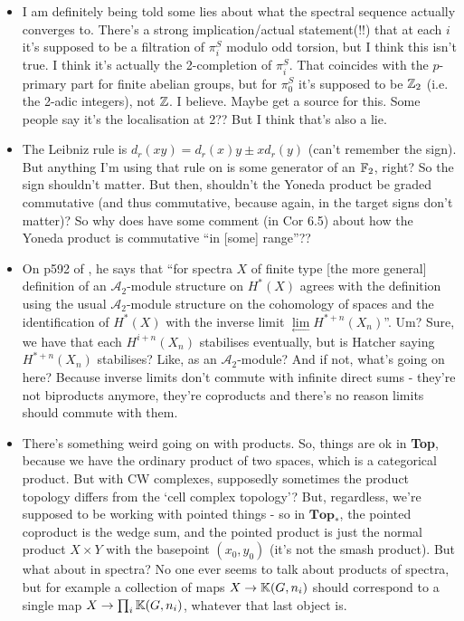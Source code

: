 \documentclass{MetricNotes2023}
\def\bb{\ensuremath\mathbb}
\def\inte{\ensuremath\mathbb{Z}}
\def\A{\ensuremath{\mathscr{A}_2}}
\begin{document}
\begin{itemize}
\item I am definitely being told some lies about what the spectral sequence actually converges to. There's a strong implication/actual statement(!!) that at each \(i\) it's supposed to be a filtration of \(\pi_i^S\) modulo odd torsion, but I think this isn't true. I think it's actually the 2-completion of \(\pi_i^S\). That coincides with the \(p\)-primary part for finite abelian groups, but for \(\pi_0^S\) it's supposed to be \(\inte_2\) (i.e. the 2-adic integers), not \(\inte\). I believe. Maybe get a source for this. Some people say it's the localisation at 2?? But I think that's also a lie. 

\item The Leibniz rule is \(d_r(xy)=d_r(x)y\pm xd_r(y)\) (can't remember the sign). But anything I'm using that rule on is some generator of an \(\bb{F}_2\), right? So the sign shouldn't matter. But then, shouldn't the Yoneda product be graded commutative (and thus commutative, because again, in the target signs don't matter)? So why does \autocite{ass} have some comment (in Cor 6.5) about how the Yoneda product is commutative ``in [some] range''?? 

\item On p592 of \autocite{hatcher5}, he says that ``for spectra \(X\) of finite type [the more general] definition of an \(\A\)-module structure on \(H^*(X)\) agrees with the definition using the usual \(\A\)-module structure on the cohomology of spaces and the identification of \(H^*(X)\) with the inverse limit \(\lim\limits_{\leftarrow}H^{*+n}(X_n)\)''. Um? Sure, we have that each \(H^{i+n}(X_n)\) stabilises eventually, but is Hatcher saying \(H^{*+n}(X_n)\) stabilises? Like, as an \(\A\)-module? And if not, what's going on here? Because inverse limits don't commute with infinite direct sums - they're not biproducts anymore, they're coproducts and there's no reason limits should commute with them. 

\item There's something weird going on with products. So, things are ok in \textbf{Top}, because we have the ordinary product of two spaces, which is a categorical product. But with CW complexes, supposedly sometimes the product topology differs from the `cell complex topology'? But, regardless, we're supposed to be working with pointed things - so in \(\textbf{Top}_*\), the pointed coproduct is the wedge sum, and the pointed product is just the normal product \(X\times Y\) with the basepoint \((x_0,y_0)\) (it's not the smash product). But what about in spectra? No one ever seems to talk about products of spectra, but for example a collection of maps \(X\to \bb{K}(G,n_i)\) should correspond to a single map \(X\to \prod_i \bb{K}(G,n_i)\), whatever that last object is. 


\end{itemize}
\end{document}
